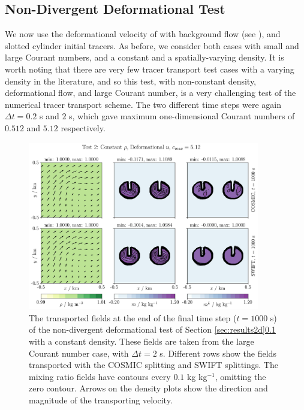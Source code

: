 \documentclass{ametsocV6.1}
\begin{document}
\subsection{Non-Divergent Deformational Test} \label{sec:test2}
We now use the deformational velocity of \cite{skamarock2006limiters} with background flow (see \citet{kent2020positive}), and slotted cylinder initial tracers. As before, we consider both cases with small and large Courant numbers, and a constant and a spatially-varying density. It is worth noting that there are very few tracer transport test cases with a varying density in the literature, and so this test, with non-constant density, deformational flow, and large Courant number, is a very challenging test of the numerical tracer transport scheme. 
The two different time steps were again $\Delta t=0.2$ s and $2$ s, which gave maximum one-dimensional Courant numbers of $0.512$ and $5.12$ respectively. \\
\begin{figure}[ht!]
\centering
\includegraphics[width=0.9\textwidth]{fig_3_deformational.jpg}
\caption{The transported fields at the end of the final time step ($t=1000$ s) of the non-divergent deformational test of Section \ref{sec:results2d}\ref{sec:test2} with a constant density. These fields are taken from the large Courant number case, with $\Delta t=2$ s. Different rows show the fields transported with the COSMIC splitting and SWIFT splittings.
The mixing ratio fields have contours every $0.1$ kg kg$^{-1}$, omitting the zero contour.
Arrows on the density plots show the direction and magnitude of the transporting velocity.}\label{fig:test2constrho}
\end{figure} \\
\end{document}
